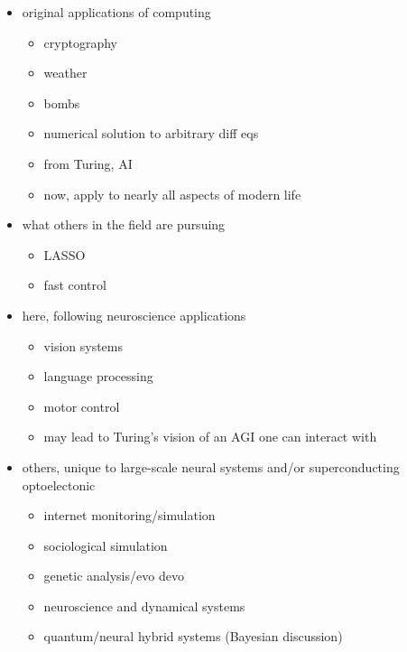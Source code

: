 \documentclass[twocolumn]{article}
\begin{document}
\begin{itemize}
\item original applications of computing
\begin{itemize}
\item cryptography
\item weather
\item bombs
\item numerical solution to arbitrary diff eqs
\item from Turing, AI
\item now, apply to nearly all aspects of modern life
\end{itemize}
\item what others in the field are pursuing
\begin{itemize}
\item LASSO \cite{dasr2018}
\item fast control \cite{prsh2017}
\end{itemize}
\item here, following neuroscience applications 
\begin{itemize}
\item vision systems
\item language processing
\item motor control
\item may lead to Turing's vision of an AGI one can interact with
\end{itemize}
\item others, unique to large-scale neural systems and/or superconducting optoelectonic
\begin{itemize}
\item internet monitoring/simulation
\item sociological simulation
\item genetic analysis/evo devo
\item neuroscience and dynamical systems
\item quantum/neural hybrid systems (Bayesian discussion)
\end{itemize}
\end{itemize}
\end{document}
